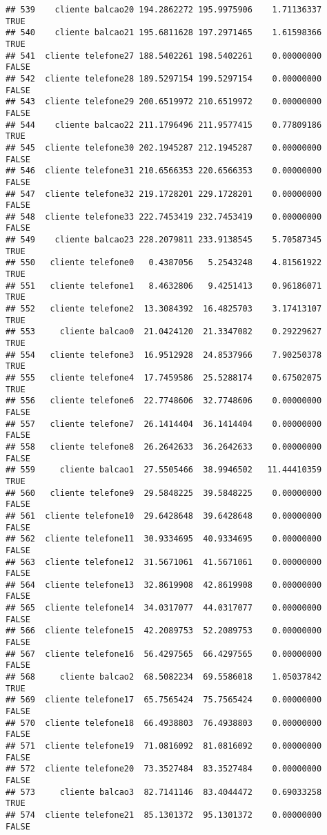 \documentclass[
]{article}
\begin{document}
\begin{verbatim}
## 539    cliente balcao20 194.2862272 195.9975906    1.71136337     TRUE
## 540    cliente balcao21 195.6811628 197.2971465    1.61598366     TRUE
## 541  cliente telefone27 188.5402261 198.5402261    0.00000000    FALSE
## 542  cliente telefone28 189.5297154 199.5297154    0.00000000    FALSE
## 543  cliente telefone29 200.6519972 210.6519972    0.00000000    FALSE
## 544    cliente balcao22 211.1796496 211.9577415    0.77809186     TRUE
## 545  cliente telefone30 202.1945287 212.1945287    0.00000000    FALSE
## 546  cliente telefone31 210.6566353 220.6566353    0.00000000    FALSE
## 547  cliente telefone32 219.1728201 229.1728201    0.00000000    FALSE
## 548  cliente telefone33 222.7453419 232.7453419    0.00000000    FALSE
## 549    cliente balcao23 228.2079811 233.9138545    5.70587345     TRUE
## 550   cliente telefone0   0.4387056   5.2543248    4.81561922     TRUE
## 551   cliente telefone1   8.4632806   9.4251413    0.96186071     TRUE
## 552   cliente telefone2  13.3084392  16.4825703    3.17413107     TRUE
## 553     cliente balcao0  21.0424120  21.3347082    0.29229627     TRUE
## 554   cliente telefone3  16.9512928  24.8537966    7.90250378     TRUE
## 555   cliente telefone4  17.7459586  25.5288174    0.67502075     TRUE
## 556   cliente telefone6  22.7748606  32.7748606    0.00000000    FALSE
## 557   cliente telefone7  26.1414404  36.1414404    0.00000000    FALSE
## 558   cliente telefone8  26.2642633  36.2642633    0.00000000    FALSE
## 559     cliente balcao1  27.5505466  38.9946502   11.44410359     TRUE
## 560   cliente telefone9  29.5848225  39.5848225    0.00000000    FALSE
## 561  cliente telefone10  29.6428648  39.6428648    0.00000000    FALSE
## 562  cliente telefone11  30.9334695  40.9334695    0.00000000    FALSE
## 563  cliente telefone12  31.5671061  41.5671061    0.00000000    FALSE
## 564  cliente telefone13  32.8619908  42.8619908    0.00000000    FALSE
## 565  cliente telefone14  34.0317077  44.0317077    0.00000000    FALSE
## 566  cliente telefone15  42.2089753  52.2089753    0.00000000    FALSE
## 567  cliente telefone16  56.4297565  66.4297565    0.00000000    FALSE
## 568     cliente balcao2  68.5082234  69.5586018    1.05037842     TRUE
## 569  cliente telefone17  65.7565424  75.7565424    0.00000000    FALSE
## 570  cliente telefone18  66.4938803  76.4938803    0.00000000    FALSE
## 571  cliente telefone19  71.0816092  81.0816092    0.00000000    FALSE
## 572  cliente telefone20  73.3527484  83.3527484    0.00000000    FALSE
## 573     cliente balcao3  82.7141146  83.4044472    0.69033258     TRUE
## 574  cliente telefone21  85.1301372  95.1301372    0.00000000    FALSE

\end{verbatim}
\end{document}
